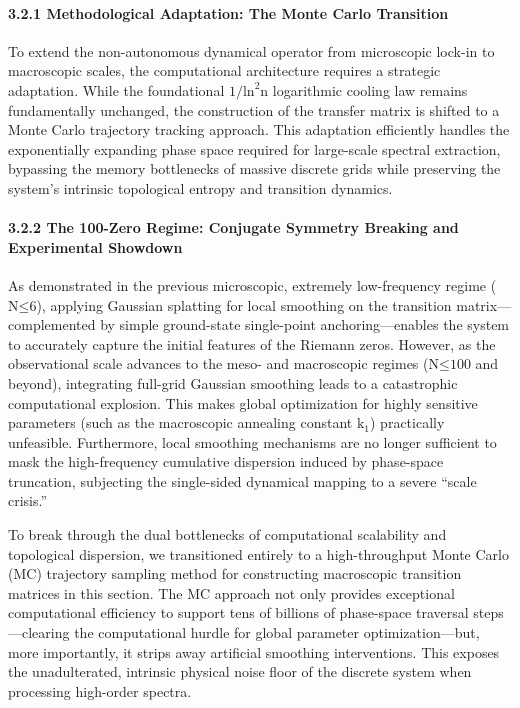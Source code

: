 \hypertarget{methodological-adaptation-the-monte-carlo-transition}{%
\paragraph{3.2.1 Methodological Adaptation: The Monte Carlo
Transition}\label{methodological-adaptation-the-monte-carlo-transition}}

To extend the non-autonomous dynamical operator from microscopic lock-in
to macroscopic scales, the computational architecture requires a
strategic adaptation. While the foundational
\(\text{1/}\text{ln}^{\text{2}}\text{n}\) logarithmic cooling law
remains fundamentally unchanged, the construction of the transfer matrix
is shifted to a Monte Carlo trajectory tracking approach. This
adaptation efficiently handles the exponentially expanding phase space
required for large-scale spectral extraction, bypassing the memory
bottlenecks of massive discrete grids while preserving the system's
intrinsic topological entropy and transition dynamics.

\hypertarget{the-100-zero-regime-conjugate-symmetry-breaking-and-experimental-showdown}{%
\paragraph{3.2.2 The 100-Zero Regime: Conjugate Symmetry Breaking and
Experimental
Showdown}\label{the-100-zero-regime-conjugate-symmetry-breaking-and-experimental-showdown}}

As demonstrated in the previous microscopic, extremely low-frequency
regime (\(\text{N}\text{≤6}\)), applying Gaussian splatting for local
smoothing on the transition matrix---complemented by simple ground-state
single-point anchoring---enables the system to accurately capture the
initial features of the Riemann zeros. However, as the observational
scale advances to the meso- and macroscopic regimes
(\(\text{N}\text{≤100}\) and beyond), integrating full-grid Gaussian
smoothing leads to a catastrophic computational explosion. This makes
global optimization for highly sensitive parameters (such as the
macroscopic annealing constant \(\text{k}_{\text{1}}\)) practically
unfeasible. Furthermore, local smoothing mechanisms are no longer
sufficient to mask the high-frequency cumulative dispersion induced by
phase-space truncation, subjecting the single-sided dynamical mapping to
a severe ``scale crisis.''

To break through the dual bottlenecks of computational scalability and
topological dispersion, we transitioned entirely to a high-throughput
Monte Carlo (MC) trajectory sampling method for constructing macroscopic
transition matrices in this section. The MC approach not only provides
exceptional computational efficiency to support tens of billions of
phase-space traversal steps---clearing the computational hurdle for
global parameter optimization---but, more importantly, it strips away
artificial smoothing interventions. This exposes the unadulterated,
intrinsic physical noise floor of the discrete system when processing
high-order spectra.

